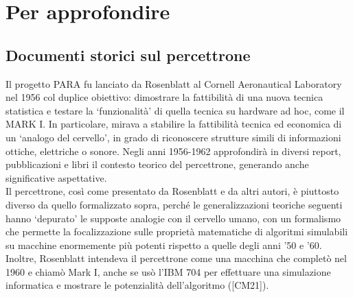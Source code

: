 \documentclass[
  letterpaper,
  DIV=11,
  numbers=noendperiod]{scrreprt}
\begin{document}
\section{Per approfondire}\label{per-approfondire}

\subsection{Documenti storici sul
percettrone}\label{documenti-storici-sul-percettrone}

Il progetto PARA fu lanciato da Rosenblatt al Cornell Aeronautical
Laboratory nel 1956 col duplice obiettivo: dimostrare la fattibilità di
una nuova tecnica statistica e testare la `funzionalità' di quella
tecnica su hardware ad hoc, come il MARK I. In particolare, mirava a
stabilire la fattibilità tecnica ed economica di un `analogo del
cervello', in grado di riconoscere strutture simili di informazioni
ottiche, elettriche o sonore. Negli anni 1956-1962 approfondirà in
diversi report, pubblicazioni e libri il contesto teorico del
percettrone, generando anche significative aspettative.\\
Il percettrone, così come presentato da Rosenblatt e da altri autori, è
piuttosto diverso da quello formalizzato sopra, perché le
generalizzazioni teoriche seguenti hanno `depurato' le supposte analogie
con il cervello umano, con un formalismo che permette la focalizzazione
sulle proprietà matematiche di algoritmi simulabili su macchine
enormemente più potenti rispetto a quelle degli anni '50 e '60. Inoltre,
Rosenblatt intendeva il percettrone come una macchina che completò nel
1960 e chiamò Mark I, anche se usò l'IBM 704 per effettuare una
simulazione informatica e mostrare le potenzialità dell'algoritmo
({[}CM21{]}).
\end{document}
